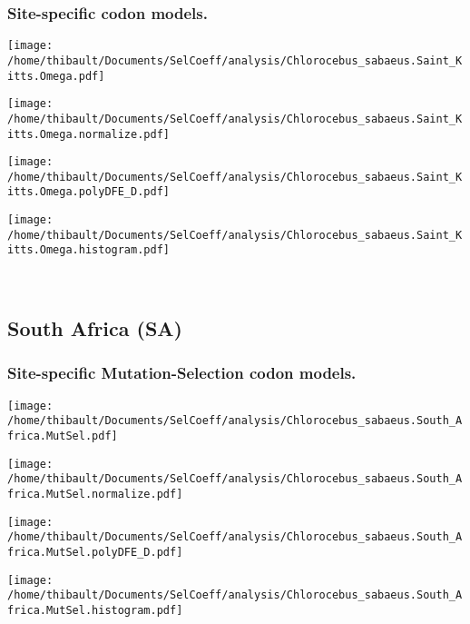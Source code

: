 \subsubsection*{Site-specific codon models.} 
\begin{minipage}{0.49\linewidth} 
\texttt{[image: /home/thibault/Documents/SelCoeff/analysis/Chlorocebus\_sabaeus.Saint\_Kitts.Omega.pdf]} 
\end{minipage}
\begin{minipage}{0.49\linewidth} 
\texttt{[image: /home/thibault/Documents/SelCoeff/analysis/Chlorocebus\_sabaeus.Saint\_Kitts.Omega.normalize.pdf]} 
\end{minipage}
\begin{minipage}{0.49\linewidth} 
\texttt{[image: /home/thibault/Documents/SelCoeff/analysis/Chlorocebus\_sabaeus.Saint\_Kitts.Omega.polyDFE\_D.pdf]} 
\end{minipage}
\begin{minipage}{0.49\linewidth} 
\texttt{[image: /home/thibault/Documents/SelCoeff/analysis/Chlorocebus\_sabaeus.Saint\_Kitts.Omega.histogram.pdf]} 
\end{minipage}
\\ 
\subsection{South Africa (SA)} 
 
\subsubsection*{Site-specific Mutation-Selection codon models.} 
\begin{minipage}{0.49\linewidth} 
\texttt{[image: /home/thibault/Documents/SelCoeff/analysis/Chlorocebus\_sabaeus.South\_Africa.MutSel.pdf]} 
\end{minipage}
\begin{minipage}{0.49\linewidth} 
\texttt{[image: /home/thibault/Documents/SelCoeff/analysis/Chlorocebus\_sabaeus.South\_Africa.MutSel.normalize.pdf]} 
\end{minipage}
\begin{minipage}{0.49\linewidth} 
\texttt{[image: /home/thibault/Documents/SelCoeff/analysis/Chlorocebus\_sabaeus.South\_Africa.MutSel.polyDFE\_D.pdf]} 
\end{minipage}
\begin{minipage}{0.49\linewidth} 
\texttt{[image: /home/thibault/Documents/SelCoeff/analysis/Chlorocebus\_sabaeus.South\_Africa.MutSel.histogram.pdf]} 
\end{minipage}
\\ 

